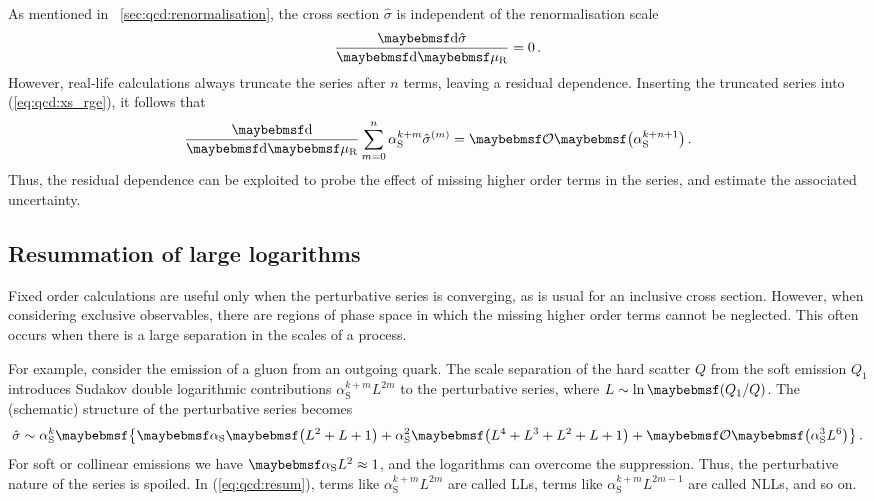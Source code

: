 As mentioned in \Section~\ref{sec:qcd:renormalisation}, the cross section $\hat{\sigma}$ 
is independent of the renormalisation scale \mur
\begin{equation}
	\frac{\d{\hat{\sigma}}}{\d{\mur}} = 0 \,.
	\label{eq:qcd:xs_rge}
\end{equation}
However, real-life calculations always truncate the series after $n$ terms, leaving a 
residual \mur dependence. Inserting the truncated series into (\ref{eq:qcd:xs_rge}), 
it follows that
\begin{equation}
	\frac{\d{}}{\d{\mur}} \sum\limits_{m=0}^{n} \alpha_{\text{S}}^{k+m} \hat{\sigma}^{(m)}
	= \ofOrder{\alpha_{\text{S}}^{k+n+1}} \,.
\end{equation}
Thus, the residual \mur dependence can be exploited to probe the effect of missing 
higher order terms in the series, and estimate the associated uncertainty.




\subsection{Resummation of large logarithms}
\label{sec:qcd:resum}

Fixed order calculations are useful only when the perturbative series is converging, as is
usual for an inclusive cross section. However, when considering exclusive observables, 
there are regions of phase space in which the missing higher order terms cannot be 
neglected. This often occurs when there is a large separation in the scales of a process.

For example, consider the emission of a gluon from an outgoing quark. The scale 
separation of the hard scatter $Q$ from the soft emission $Q_1$ introduces Sudakov double 
logarithmic contributions $\alpha_{\text{S}}^{k+m} L^{2m}$ to the perturbative series, 
where $L \sim \ln\parenths{Q_1 / Q}$. The (schematic) structure of the perturbative 
series becomes
\begin{equation}
	\hat{\sigma} \sim \alpha_{\text{S}}^k \braces{\alphaS \parenths{L^2 + L + 1}
	+ \alpha_{\text{S}}^2 \parenths{L^4 + L^3 + L^2 + L + 1} 
	+ \ofOrder{\alpha_{\text{S}}^3 L^6}} \,.
	\label{eq:qcd:resum}
\end{equation}
For soft or collinear emissions we have $\alphaS L^2 \approx 1$, and the logarithms can 
overcome the \alphaS suppression. Thus, the perturbative nature of the series is spoiled. 
In (\ref{eq:qcd:resum}), terms like $\alpha_{\text{S}}^{k+m} L^{2m}$ are called \acp{LL}, 
terms like $\alpha_{\text{S}}^{k+m} L^{2m-1}$ are called \acp{NLL}, and so on.

